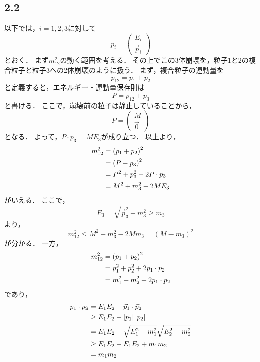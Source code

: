 \subsection*{2.2}
以下では，$i=1,2,3$に対して
\begin{equation}
  p_i = \left(
    \begin{array}{c}
      E_i \\
      \vec{p}_i
    \end{array}
  \right)  
\end{equation}
とおく．
まず$m_{12}^2$の動く範囲を考える．
その上でこの3体崩壊を，粒子1と2の複合粒子と粒子3への2体崩壊のように扱う．
まず，複合粒子の運動量を
\begin{equation}
  p_{12} = p_1 + p_2
\end{equation}
と定義すると，エネルギー・運動量保存則は
\begin{equation}
  P = p_{12} + p_3
\end{equation}
と書ける．
ここで，崩壊前の粒子は静止していることから，
\begin{equation}
  P = \left(
    \begin{array}{c}
      M \\
      \vec{0}
    \end{array}
  \right)
\end{equation}
となる．
よって，$P\cdot p_3 = ME_3$が成り立つ．
以上より，
\begin{align}
  m_{12}^2 &= \left(p_1 + p_2\right)^2 \notag\\
  &= \left(P - p_3\right)^2 \notag\\
  &= P^2 + p_3^2 - 2P\cdot p_3 \notag\\
  &= M^2 + m_3^2 - 2ME_3
\end{align}
がいえる．
ここで，
\begin{equation}
  E_3 = \sqrt{\vec{p}_3^2 + m_3^2} \ge m_3
\end{equation}
より，
\begin{equation}
  m_{12}^2 \le M^2 + m_3^2 - 2Mm_3 = \left(M - m_3\right)^2
\end{equation}
が分かる．
一方，
\begin{align}
  m_{12}^2 &= \left(p_1 + p_2\right)^2 \notag\\
  &= p_1^2 + p_2^2 + 2p_1\cdot p_2 \notag\\
  &= m_1^2 + m_2^2 + 2p_1\cdot p_2 
\end{align}
であり，
\begin{align}
  p_1 \cdot p_2 &= E_1E_2 - \vec{p}_1 \cdot \vec{p}_2 \notag\\
  &\ge E_1E_2 - \left| p_1 \right| \left| p_2 \right| \notag\\
  &= E_1E_2 - \sqrt{E_1^2 - m_1^2} \sqrt{E_2^2 - m_2^2} \notag\\
  &\ge E_1E_2 - E_1E_2 + m_1m_2 \notag\\
  &= m_1m_2
\end{align}
